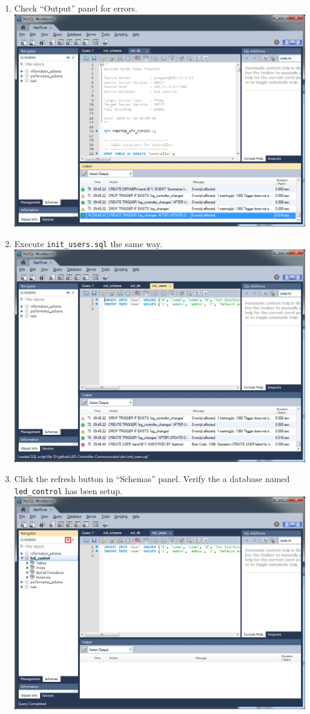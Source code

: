 \begin{enumerate}
\item
  Check ``Output'' panel for errors.
  \includegraphics{img/db_init_10.png}
\item
  Execute \texttt{init\_users.sql} the same way.
  \includegraphics{img/db_init_11.png}
\item
  Click the refresh button in ``Schemas'' panel. Verify the a database
  named \texttt{led\_control} has been setup.
  \includegraphics{img/db_init_12.png}
\end{enumerate}

